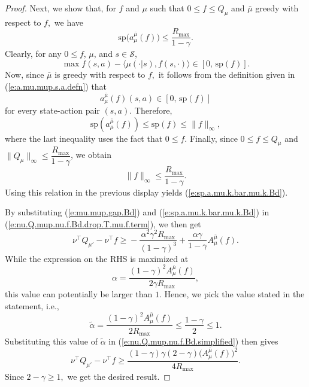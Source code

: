 \documentclass[twoside]{article}
\theoremstyle{plain}
\theoremstyle{definition}
\theoremstyle{remark}
\renewcommand{\sp}{\mathrm{sp}}
\newcommand{\tr}{\top}
\newcommand{\mup}{\mu'}
\newcommand{\mub}{\bar{\mu}}
\newcommand{\cS}{\mathcal{S}}
\renewcommand{\eqref}[1]{(\ref{#1})}
\begin{document}
\begin{proof}
    Next, we show that, for $f$ and $\mu$ such that $0 \leq f \leq Q_{\mu}$ and $\mub$ greedy with respect to $f,$ we have
    \begin{equation}
    \label{e:sp.a.mu.k.bar.mu.k.Bd}
        \sp \big(a^{\mub}_{\mu}(f)\big) \le \frac{R_{\max}}{1-\gamma}.
    \end{equation}
    Clearly, for any $0 \leq f$, $\mu$, and $s \in \cS$,
    \begin{equation}
        \max f(s, a)-\langle \mu(\cdot|s), f(s,\cdot)\rangle \in [0,\, \sp(f)].
    \end{equation}
    Now, since $\mub$ is greedy with respect to $f,$ it follows from the definition given in  \eqref{e:a.mu.mup.s.a.defn} that
    \[
        a_{\mu}^{\mub}(f)(s, a) \in [0,\, \sp(f)]
    \]
    for every state-action pair $(s, a).$ Therefore,
    \[
        \sp(a_{\mu}^{\mub}(f)) \le \sp(f) \le \|f\|_\infty,
    \]
    where the last inequality uses the fact that $0 \leq f.$
    Finally, since \(0 \le f \le Q_\mu\) and \(\|Q_\mu\|_\infty \leq \dfrac{R_{\max}}{1-\gamma}\), we obtain
    \[
        \|f\|_\infty \le \frac{R_{\max}}{1-\gamma}.
    \]
    Using this relation in the previous display yields \eqref{e:sp.a.mu.k.bar.mu.k.Bd}.
    
    By substituting \eqref{e:mu.mup.gap.Bd} and \eqref{e:sp.a.mu.k.bar.mu.k.Bd} in \eqref{e:nu.Q.mup.nu.f.Bd.drop.T.mu.f.term}, we then get
    \begin{equation}
    \label{e:nu.Q.mup.nu.f.Bd.simplified}
        \nu^\tr Q_{\mup} - \nu^\tr f 
        \geq {} - \frac{ \alpha^2 \gamma^2 R_{\max}}{(1 - \gamma)^3}  + \frac{ \alpha\gamma}{1 - \gamma} A_{\mu}^{\mub} (f).
    \end{equation}
    While the expression on the RHS is maximized at 
    \[
        \alpha = \frac{(1 - \gamma)^2 A_\mu^{\bar{\mu}}(f)}{2 \gamma R_{\max}},
    \]
    this value can potentially be larger than $1.$ Hence, we pick the value stated in the statement, i.e.,
    \[
        \tilde{\alpha} = \frac{(1 - \gamma)^2 A_\mu^{\bar{\mu}}(f)}{2 R_{\max}} \leq \frac{1 - \gamma}{2} \leq 1.
    \]
    Substituting this value of $\tilde{\alpha}$ in \eqref{e:nu.Q.mup.nu.f.Bd.simplified} then gives 
    \[
        \nu^\tr Q_{\mup} - \nu^\tr f 
        \geq {} \frac{(1 - \gamma) \gamma (2 - \gamma) \Big(A_{\mu}^{\mub}(f)\Big)^2}{4 R_{\max}}.
    \]
    Since $2 - \gamma \geq 1,$ we get the desired result. 
\end{proof}
\end{document}
